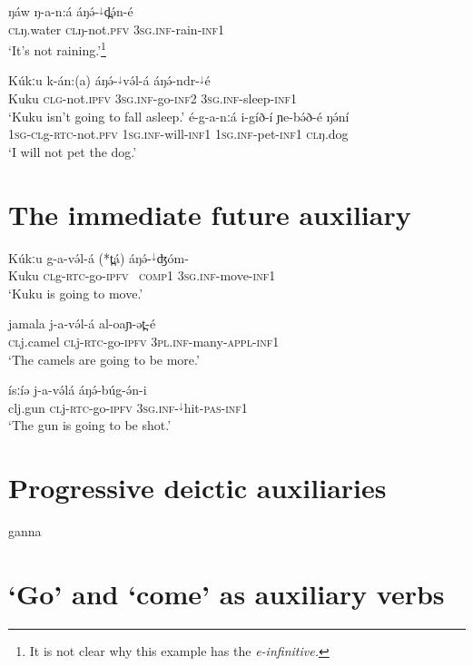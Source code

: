 \ea \gll  ŋáw ŋ-a-n:á  áŋə́-$^{↓}$d̪ə́n-é\\
\textsc{cl}ŋ.water \textsc{cl}ŋ-not.\textsc{pfv}   \textsc{3sg.inf}-rain-\textsc{inf1}\\
\glt ‘It's not raining.’\footnote{It is not clear why this example has the \it{e}-infinitive.}
\z 

\ea  \label{notgo} 
\ea \gll  Kúkːu k-án:(a) áŋə́-$^{↓}$və́l-á áŋə́-ndr-$^{↓}$é\\
Kuku \textsc{clg}-not.\textsc{ipfv} \textsc{3sg.inf}-go-\textsc{inf2} \textsc{3sg.inf}-sleep-\textsc{inf1}\\
\glt `Kuku isn't going to fall asleep.' 
\ex \gll   é-g-a-nːá i-gíð-í ɲe-bə́ð-é ŋə́ní		\\
\textsc{1sg}-\textsc{cl}g-\textsc{rtc}-not.\textsc{pfv} \textsc{1sg.inf}-will-\textsc{inf1} \textsc{1sg.inf}-pet-\textsc{inf1} \textsc{cl}ŋ.dog\\
\glt ‘I will not pet the dog.’	
\z 
\z 


\section{The immediate future auxiliary}

\ea   \gll Kúkːu g-a-və́l-á (*t̪á) áŋə́-$^{↓}$ʤóm- \\
Kuku \textsc{cl}g-\textsc{rtc}-go-\textsc{ipfv} {\ \textsc{comp1}} \textsc{3sg.inf}-move-\textsc{inf1}\\
\glt ‘Kuku is going to move.'
\z 

\ea \gll  jamala j-a-və́l-á al-oaɲ-ət̪-é\\
\textsc{cl}j.camel \textsc{cl}j-\textsc{rtc}-go-\textsc{ipfv} \textsc{3pl.inf}-many-\textsc{appl}-\textsc{inf1}\\
\glt ‘The camels are going to be more.'
\z 

\ea \gll  ísːíə j-a-və́lá áŋə́-búg-ə́n-i	\\
{cl}j.gun \textsc{cl}j-\textsc{rtc}-go-\textsc{ipfv}  \textsc{3sg.inf}-$^{↓}$hit-\textsc{pas}-\textsc{inf1}\\
\glt ‘The gun is going to be shot.’
\z 

\section{Progressive deictic auxiliaries}\label{sec:ch14:progaux}

ganna 


\section{`Go' and `come' as auxiliary verbs}\label{sec:ch14:goaux}

